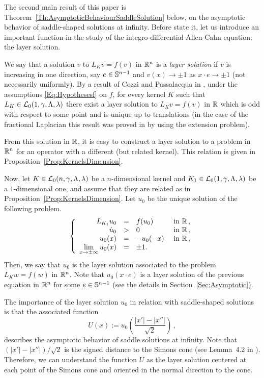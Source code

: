 The second main result of this paper is Theorem~\ref{Th:AsymptoticBehaviourSaddleSolution} below, on the asymptotic behavior of saddle-shaped solutions at infinity. Before state it, let us introduce an important function in the study of the integro-differential Allen-Cahn equation: the layer solution.


We say that a solution $v$ to $L_K v = f(v)$ in $\mathbb{R}^n$ is a \emph{layer solution} if $v$ is increasing in one direction, say $e\in \mathbb{S}^{n-1}$ and $v(x) \to \pm 1$ as $x\cdot e \to \pm 1$ (not necessarily uniformly). By a result of Cozzi and Passalacqua in \cite{CozziPassalacqua}, under the assumptions \eqref{Eq:Hypothesesf} on $f$, for every kernel $K$ such that $L_K\in \mathcal{L}_0(1,\gamma,\Lambda, \lambda)$ there exist a layer solution  to $L_K v = f(v)$ in $\mathbb{R}$ which is odd with respect to some point and is unique up to translations (in the case of the fractional Laplacian this result was proved in \cite{CabreSolaMorales,CabreSireII} by using the extension problem). 

From this solution in $\mathbb{R}$, it is easy to construct a layer solution to a problem in $\mathbb{R}^n$ for an operator with a different (but related kernel). This relation is given in Proposition~\ref{Prop:KernelsDimension}. 


Now, let $K\in\mathcal{L}_0(n,\gamma,\Lambda, \lambda)$ be a $n$-dimensional kernel and $K_1\in \mathcal{L}_0(1,\gamma,\Lambda, \lambda)$ be a $1$-dimensional one, and assume that they are related as in Proposition~\ref{Prop:KernelsDimension}. Let $u_0$ be the unique solution of the following problem.
	\begin{equation}
	\label{Eq:LayerSolution}
	\left\{\begin{array}{rcll}
	L_{K_1}  u_0 &=& f(u_0) & \textrm{ in }\mathbb{R}\,,\\
	\dot{u}_0 &>& 0 & \textrm{ in } \mathbb{R}\,,\\
	u_0(x) & = &-u_0(-x)  & \textrm{ in }\mathbb{R}\,,\\
	\displaystyle \lim_{x \to \pm \infty} u_0(x) &=& \pm 1. & 
	\end{array} \right.
	\end{equation}
Then, we say that $u_0$ is the layer solution associated to the problem $L_K w = f(w)$ in $\mathbb{R}^{n}$. Note that $u_0(x\cdot e)$ is a layer solution of the previous equation in $\mathbb{R}^n$ for some $e\in \mathbb{S}^{n-1}$ (see the details in Section~\ref{Sec:Asymptotic}).

The importance of the layer solution $u_0$ in relation with saddle-shaped solutions is that the associated function
	\begin{equation}
	\label{Eq:DefOfU}
	U(x):= u_0 \left( \dfrac{|x'| - |x''|}{\sqrt{2}} \right)\,,
	\end{equation}
describes the asymptotic behavior of saddle solutions at infinity. Note that $(|x'| - |x''| )/\sqrt{2}$ is the signed distance to the Simons cone (see Lemma~4.2 in \cite{CabreTerraII}). Therefore, we can understand the function $U$ as the layer solution centered at each point of the Simons cone and oriented in the normal direction to the cone.

